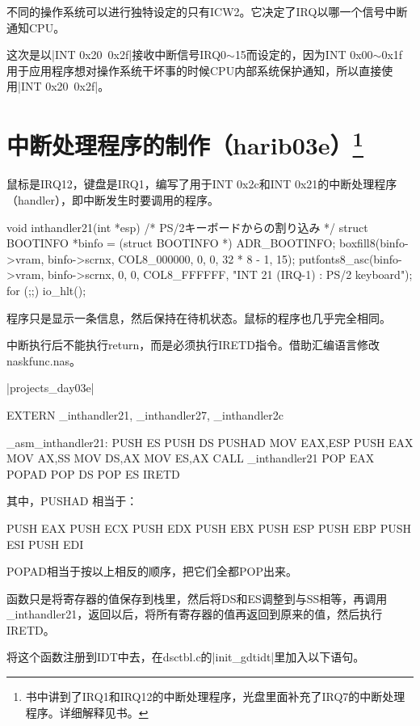 不同的操作系统可以进行独特设定的只有ICW2。它决定了IRQ以哪一个信号中断通知CPU。

这次是以|INT 0x20~0x2f|接收中断信号IRQ0$\sim$15而设定的，因为INT 0x00$\sim$0x1f用于应用程序想对操作系统干坏事的时候CPU内部系统保护通知，所以直接使用|INT 0x20~0x2f|。

\section[中断处理程序的制作（harib03e）]{中断处理程序的制作（harib03e）\protect\footnote{书中讲到了IRQ1和IRQ12的中断处理程序，光盘里面补充了IRQ7的中断处理程序。详细解释见书。}}
鼠标是IRQ12，键盘是IRQ1，编写了用于INT 0x2c和INT 0x21的中断处理程序（handler），即中断发生时要调用的程序。

\begin{code}[label=int.c节选]
void inthandler21(int *esp)
/* PS/2キーボードからの割り込み */
{
	struct BOOTINFO *binfo = (struct BOOTINFO *) ADR_BOOTINFO;
	boxfill8(binfo->vram, binfo->scrnx, COL8_000000, 0, 0, 32 * 8 - 1, 15);
	putfonts8_asc(binfo->vram, binfo->scrnx, 0, 0, COL8_FFFFFF, "INT 21 (IRQ-1) : PS/2 keyboard");
	for (;;) {
		io_hlt();
	}
}
\end{code}
程序只是显示一条信息，然后保持在待机状态。鼠标的程序也几乎完全相同。

\cs

中断执行后不能执行return，而是必须执行IRETD指令。借助汇编语言修改naskfunc.nas。

\dag|projects_day\harib03e|
\begin{code}[label=naskfunc.nas节选]
		EXTERN	_inthandler21, _inthandler27, _inthandler2c

_asm_inthandler21:
		PUSH	ES
		PUSH	DS
		PUSHAD
		MOV		EAX,ESP
		PUSH	EAX
		MOV		AX,SS
		MOV		DS,AX
		MOV		ES,AX
		CALL	_inthandler21
		POP		EAX
		POPAD
		POP		DS
		POP		ES
		IRETD
\end{code}

其中，PUSHAD 相当于：
\begin{code}
PUSH EAX
PUSH ECX
PUSH EDX
PUSH EBX
PUSH ESP
PUSH EBP
PUSH ESI
PUSH EDI
\end{code}
POPAD相当于按以上相反的顺序，把它们全都POP出来。

\cs

函数只是将寄存器的值保存到栈里，然后将DS和ES调整到与SS相等，再调用\_inthandler21，返回以后，将所有寄存器的值再返回到原来的值，然后执行IRETD。

\cs

将这个函数注册到IDT中去，在dsctbl.c的|init_gdtidt|里加入以下语句。

